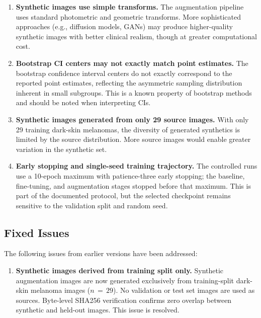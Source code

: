 \begin{enumerate}
    \item \textbf{Synthetic images use simple transforms.} The augmentation pipeline uses standard photometric and geometric transforms. More sophisticated approaches (e.g., diffusion models, GANs) may produce higher-quality synthetic images with better clinical realism, though at greater computational cost.

    \item \textbf{Bootstrap CI centers may not exactly match point estimates.} The bootstrap confidence interval centers do not exactly correspond to the reported point estimates, reflecting the asymmetric sampling distribution inherent in small subgroups. This is a known property of bootstrap methods and should be noted when interpreting CIs.

    \item \textbf{Synthetic images generated from only 29 source images.} With only 29 training dark-skin melanomas, the diversity of generated synthetics is limited by the source distribution. More source images would enable greater variation in the synthetic set.

    \item \textbf{Early stopping and single-seed training trajectory.} The controlled runs use a 10-epoch maximum with patience-three early stopping; the baseline, fine-tuning, and augmentation stages stopped before that maximum. This is part of the documented protocol, but the selected checkpoint remains sensitive to the validation split and random seed.
\end{enumerate}

\subsection{Fixed Issues}

The following issues from earlier versions have been addressed:

\begin{enumerate}
    \item \textbf{Synthetic images derived from training split only.} Synthetic augmentation images are now generated exclusively from training-split dark-skin melanoma images ($n\,{=}\,29$). No validation or test set images are used as sources. Byte-level SHA256 verification confirms zero overlap between synthetic and held-out images. This issue is resolved.
\end{enumerate}
